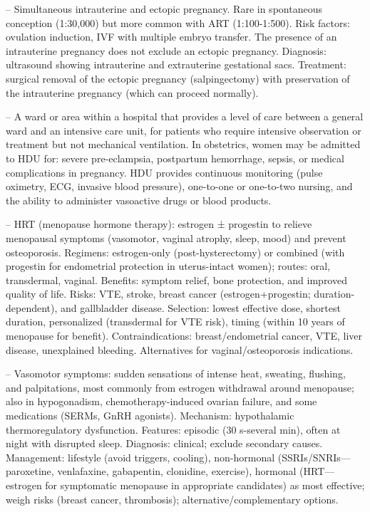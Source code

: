 -- Simultaneous intrauterine and ectopic pregnancy. Rare in spontaneous conception (1:30,000) but more common with ART (1:100-1:500). Risk factors: ovulation induction, IVF with multiple embryo transfer. The presence of an intrauterine pregnancy does not exclude an ectopic pregnancy. Diagnosis: ultrasound showing intrauterine and extrauterine gestational sacs. Treatment: surgical removal of the ectopic pregnancy (salpingectomy) with preservation of the intrauterine pregnancy (which can proceed normally).

-- A ward or area within a hospital that provides a level of care between a general ward and an intensive care unit, for patients who require intensive observation or treatment but not mechanical ventilation. In obstetrics, women may be admitted to HDU for: severe pre-eclampsia, postpartum hemorrhage, sepsis, or medical complications in pregnancy. HDU provides continuous monitoring (pulse oximetry, ECG, invasive blood pressure), one-to-one or one-to-two nursing, and the ability to administer vasoactive drugs or blood products.

-- HRT (menopause hormone therapy): estrogen ± progestin to relieve menopausal symptoms (vasomotor, vaginal atrophy, sleep, mood) and prevent osteoporosis. Regimens: estrogen-only (post-hysterectomy) or combined (with progestin for endometrial protection in uterus-intact women); routes: oral, transdermal, vaginal. Benefits: symptom relief, bone protection, and improved quality of life. Risks: VTE, stroke, breast cancer (estrogen+progestin; duration-dependent), and gallbladder disease. Selection: lowest effective dose, shortest duration, personalized (transdermal for VTE risk), timing (within 10 years of menopause for benefit). Contraindications: breast/endometrial cancer, VTE, liver disease, unexplained bleeding. Alternatives for vaginal/osteoporosis indications.

-- Vasomotor symptoms: sudden sensations of intense heat, sweating, flushing, and palpitations, most commonly from estrogen withdrawal around menopause; also in hypogonadism, chemotherapy-induced ovarian failure, and some medications (SERMs, GnRH agonists). Mechanism: hypothalamic thermoregulatory dysfunction. Features: episodic (30 s-several min), often at night with disrupted sleep. Diagnosis: clinical; exclude secondary causes. Management: lifestyle (avoid triggers, cooling), non-hormonal (SSRIs/SNRIs—paroxetine, venlafaxine, gabapentin, clonidine, exercise), hormonal (HRT—estrogen for symptomatic menopause in appropriate candidates) as most effective; weigh risks (breast cancer, thrombosis); alternative/complementary options.

